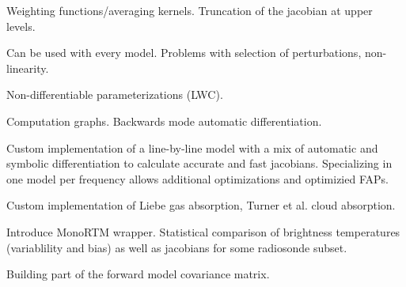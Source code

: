 \startsection[title=Calculating the Jacobian]

    Weighting functions/averaging kernels. Truncation of the jacobian at upper
    levels.

    \startsubsection[title=Finite Differences]

        Can be used with every model. Problems with selection of perturbations,
        non-linearity.
        
    \stopsubsection

    \startsubsection[title=Symbolic Differentiation]

        Non-differentiable parameterizations (LWC).

    \stopsubsection

    \startsubsection[title=Automatic Differentiation]

        Computation graphs. Backwards mode automatic differentiation.
        
    \stopsubsection

\stopsection


\startsection[title=A Numerical Model]

    Custom implementation of a line-by-line model with a mix of automatic and
    symbolic differentiation to calculate accurate and fast jacobians.
    Specializing in one model per frequency allows additional optimizations
    and optimizied FAPs.

    \startsubsection[title=Implementation]

        Custom implementation of Liebe gas absorption, Turner et al. cloud
        absorption.

    \stopsubsection

    \startsubsection[title=Comparison with MonoRTM]

        Introduce MonoRTM wrapper. Statistical comparison of brightness
        temperatures (variablility and bias) as well as jacobians for some
        radiosonde subset.

    \stopsubsection

    \startsubsection[title={Characterizing Errors},reference=rtm_errors]

        Building part of the forward model covariance matrix.

    \stopsubsection

\stopsection

